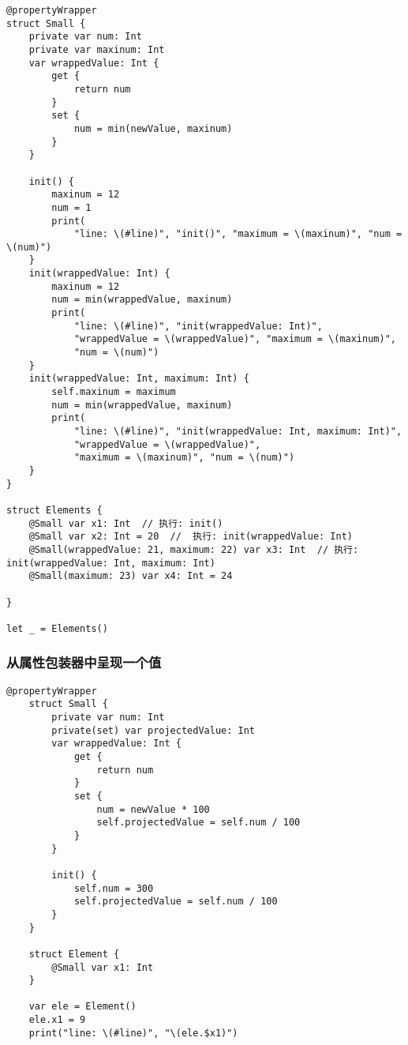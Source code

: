 \documentclass{../main.tex}{subfiles}
\begin{document}
\begin{lstlisting}[style = lstCodeStyleSwift, caption = {属性包装器设置被包装属性初始值}]
@propertyWrapper
struct Small {
    private var num: Int
    private var maxinum: Int
    var wrappedValue: Int {
        get {
            return num
        }
        set {
            num = min(newValue, maxinum)
        }
    }

    init() {
        maxinum = 12
        num = 1
        print(
            "line: \(#line)", "init()", "maximum = \(maxinum)", "num = \(num)")
    }
    init(wrappedValue: Int) {
        maxinum = 12
        num = min(wrappedValue, maxinum)
        print(
            "line: \(#line)", "init(wrappedValue: Int)",
            "wrappedValue = \(wrappedValue)", "maximum = \(maxinum)",
            "num = \(num)")
    }
    init(wrappedValue: Int, maximum: Int) {
        self.maxinum = maximum
        num = min(wrappedValue, maxinum)
        print(
            "line: \(#line)", "init(wrappedValue: Int, maximum: Int)",
            "wrappedValue = \(wrappedValue)",
            "maximum = \(maxinum)", "num = \(num)")
    }
}

struct Elements {
    @Small var x1: Int  // 执行: init()
    @Small var x2: Int = 20  //  执行: init(wrappedValue: Int)
    @Small(wrappedValue: 21, maximum: 22) var x3: Int  // 执行: init(wrappedValue: Int, maximum: Int)
    @Small(maximum: 23) var x4: Int = 24

}

let _ = Elements()

\end{lstlisting}

\subsubsection{从属性包装器中呈现一个值}
\begin{lstlisting}[style = lstCodeStyleSwift, caption = {从属性包装器中呈现一个值}]
    @propertyWrapper
    struct Small {
        private var num: Int
        private(set) var projectedValue: Int
        var wrappedValue: Int {
            get {
                return num
            }
            set {
                num = newValue * 100
                self.projectedValue = self.num / 100
            }
        }

        init() {
            self.num = 300
            self.projectedValue = self.num / 100
        }
    }

    struct Element {
        @Small var x1: Int
    }

    var ele = Element()
    ele.x1 = 9
    print("line: \(#line)", "\(ele.$x1)")
\end{lstlisting}
\end{document}
